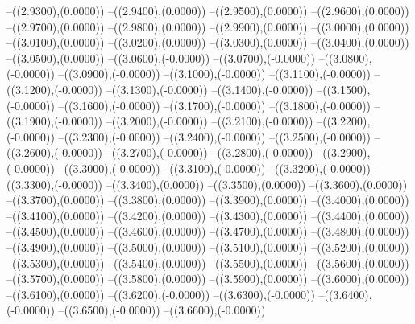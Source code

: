 {	--({\sx*(2.9300)},{\sy*(0.0000)})
	--({\sx*(2.9400)},{\sy*(0.0000)})
	--({\sx*(2.9500)},{\sy*(0.0000)})
	--({\sx*(2.9600)},{\sy*(0.0000)})
	--({\sx*(2.9700)},{\sy*(0.0000)})
	--({\sx*(2.9800)},{\sy*(0.0000)})
	--({\sx*(2.9900)},{\sy*(0.0000)})
	--({\sx*(3.0000)},{\sy*(0.0000)})
	--({\sx*(3.0100)},{\sy*(0.0000)})
	--({\sx*(3.0200)},{\sy*(0.0000)})
	--({\sx*(3.0300)},{\sy*(0.0000)})
	--({\sx*(3.0400)},{\sy*(0.0000)})
	--({\sx*(3.0500)},{\sy*(0.0000)})
	--({\sx*(3.0600)},{\sy*(-0.0000)})
	--({\sx*(3.0700)},{\sy*(-0.0000)})
	--({\sx*(3.0800)},{\sy*(-0.0000)})
	--({\sx*(3.0900)},{\sy*(-0.0000)})
	--({\sx*(3.1000)},{\sy*(-0.0000)})
	--({\sx*(3.1100)},{\sy*(-0.0000)})
	--({\sx*(3.1200)},{\sy*(-0.0000)})
	--({\sx*(3.1300)},{\sy*(-0.0000)})
	--({\sx*(3.1400)},{\sy*(-0.0000)})
	--({\sx*(3.1500)},{\sy*(-0.0000)})
	--({\sx*(3.1600)},{\sy*(-0.0000)})
	--({\sx*(3.1700)},{\sy*(-0.0000)})
	--({\sx*(3.1800)},{\sy*(-0.0000)})
	--({\sx*(3.1900)},{\sy*(-0.0000)})
	--({\sx*(3.2000)},{\sy*(-0.0000)})
	--({\sx*(3.2100)},{\sy*(-0.0000)})
	--({\sx*(3.2200)},{\sy*(-0.0000)})
	--({\sx*(3.2300)},{\sy*(-0.0000)})
	--({\sx*(3.2400)},{\sy*(-0.0000)})
	--({\sx*(3.2500)},{\sy*(-0.0000)})
	--({\sx*(3.2600)},{\sy*(-0.0000)})
	--({\sx*(3.2700)},{\sy*(-0.0000)})
	--({\sx*(3.2800)},{\sy*(-0.0000)})
	--({\sx*(3.2900)},{\sy*(-0.0000)})
	--({\sx*(3.3000)},{\sy*(-0.0000)})
	--({\sx*(3.3100)},{\sy*(-0.0000)})
	--({\sx*(3.3200)},{\sy*(-0.0000)})
	--({\sx*(3.3300)},{\sy*(-0.0000)})
	--({\sx*(3.3400)},{\sy*(0.0000)})
	--({\sx*(3.3500)},{\sy*(0.0000)})
	--({\sx*(3.3600)},{\sy*(0.0000)})
	--({\sx*(3.3700)},{\sy*(0.0000)})
	--({\sx*(3.3800)},{\sy*(0.0000)})
	--({\sx*(3.3900)},{\sy*(0.0000)})
	--({\sx*(3.4000)},{\sy*(0.0000)})
	--({\sx*(3.4100)},{\sy*(0.0000)})
	--({\sx*(3.4200)},{\sy*(0.0000)})
	--({\sx*(3.4300)},{\sy*(0.0000)})
	--({\sx*(3.4400)},{\sy*(0.0000)})
	--({\sx*(3.4500)},{\sy*(0.0000)})
	--({\sx*(3.4600)},{\sy*(0.0000)})
	--({\sx*(3.4700)},{\sy*(0.0000)})
	--({\sx*(3.4800)},{\sy*(0.0000)})
	--({\sx*(3.4900)},{\sy*(0.0000)})
	--({\sx*(3.5000)},{\sy*(0.0000)})
	--({\sx*(3.5100)},{\sy*(0.0000)})
	--({\sx*(3.5200)},{\sy*(0.0000)})
	--({\sx*(3.5300)},{\sy*(0.0000)})
	--({\sx*(3.5400)},{\sy*(0.0000)})
	--({\sx*(3.5500)},{\sy*(0.0000)})
	--({\sx*(3.5600)},{\sy*(0.0000)})
	--({\sx*(3.5700)},{\sy*(0.0000)})
	--({\sx*(3.5800)},{\sy*(0.0000)})
	--({\sx*(3.5900)},{\sy*(0.0000)})
	--({\sx*(3.6000)},{\sy*(0.0000)})
	--({\sx*(3.6100)},{\sy*(0.0000)})
	--({\sx*(3.6200)},{\sy*(-0.0000)})
	--({\sx*(3.6300)},{\sy*(-0.0000)})
	--({\sx*(3.6400)},{\sy*(-0.0000)})
	--({\sx*(3.6500)},{\sy*(-0.0000)})
	--({\sx*(3.6600)},{\sy*(-0.0000)})
}
